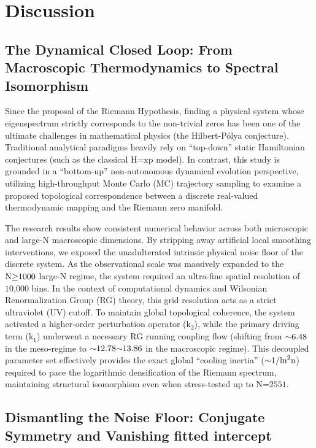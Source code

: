 \documentclass[fleqn,10pt]{wlscirep}
\begin{document}
\section*{Discussion}

\subsection*{The Dynamical Closed Loop: From Macroscopic Thermodynamics to Spectral Isomorphism}

Since the proposal of the Riemann Hypothesis, finding a physical system
whose eigenspectrum strictly corresponds to the non-trivial zeros has
been one of the ultimate challenges in mathematical physics (the
Hilbert-P\'olya conjecture). Traditional analytical paradigms heavily rely
on ``top-down'' static Hamiltonian conjectures (such as the classical
\(\text{H}\text{=}\text{xp}\) model). In contrast, this study is
grounded in a ``bottom-up'' non-autonomous dynamical evolution
perspective, utilizing high-throughput Monte Carlo (MC) trajectory
sampling to examine a proposed topological
correspondence between a discrete real-valued thermodynamic mapping and the
Riemann zero manifold.

The research results show consistent numerical behavior across both
microscopic and large-N macroscopic dimensions. By stripping away
artificial local smoothing interventions, we exposed the unadulterated
intrinsic physical noise floor of the discrete system. As the
observational scale was massively expanded to the
\(\text{N}\text{\ensuremath{\ge}1000}\) large-N regime, the system required an
ultra-fine spatial resolution of \(\text{10,000}\) bins. In the context
of computational dynamics and Wilsonian Renormalization Group (RG)
theory, this grid resolution acts as a strict ultraviolet (UV) cutoff.
To maintain global topological coherence, the system activated a
higher-order perturbation operator (\(\text{k}_{\text{2}}\)), while the
primary driving term (\(\text{k}_{\text{1}}\)) underwent a necessary RG
running coupling flow (shifting from \(\text{\ensuremath{\sim}6.48}\) in the meso-regime
to \(\text{\ensuremath{\sim}12.78\ensuremath{\sim}13.86}\) in the macroscopic regime). This decoupled
parameter set effectively provides the exact global ``cooling inertia''
(\(\text{\ensuremath{\sim}1/}\text{ln}^{\text{2}}\text{n}\)) required to pace the
logarithmic densification of the Riemann spectrum, maintaining
structural isomorphism even when stress-tested up to
\(\text{N}\text{=2551}\).

\subsection*{Dismantling the Noise Floor: Conjugate Symmetry and Vanishing fitted intercept}
\end{document}
